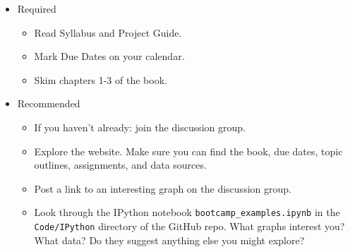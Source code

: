 \begin{itemize}
\item Required
\begin{itemize}
\item Read Syllabus and Project Guide.
\item Mark Due Dates on your calendar.
\item Skim chapters 1-3 of the book.
\end{itemize}
\item Recommended
\begin{itemize}
\item If you haven't already:  join the discussion group.
\item Explore the website.  Make sure you can find the book, due dates,
topic outlines, assignments, and data sources.
\item Post a link to an interesting graph on the discussion group.
\item Look through the IPython notebook \verb|bootcamp_examples.ipynb|
in the {\tt Code/IPython} directory of the GitHub repo.
What graphs interest you?  What data?
Do they suggest anything else you might explore?
\end{itemize}
\end{itemize}



